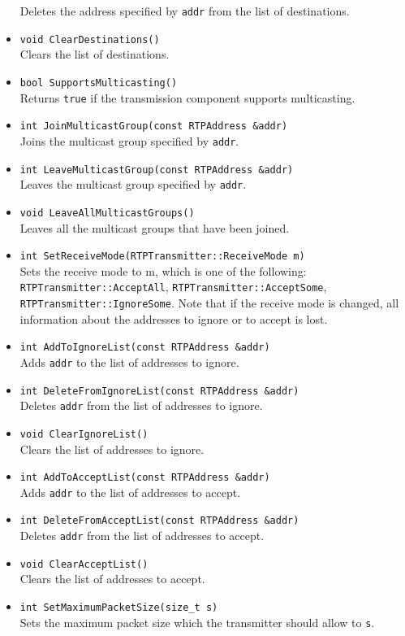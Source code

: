 \documentclass[12pt,a4paper]{article}
\begin{document}
\begin{itemize}
						Deletes the address specified by {\tt addr} from the list
						of destinations.
					\item {\tt void ClearDestinations()}\\
						Clears the list of destinations.
					\item {\tt bool SupportsMulticasting()}\\
						Returns {\tt true} if the transmission component supports
						multicasting.
					\item {\tt int JoinMulticastGroup(const RTPAddress \&addr)}\\
						Joins the multicast group specified by {\tt addr}.
					\item {\tt int LeaveMulticastGroup(const RTPAddress \&addr)}\\
						Leaves the multicast group specified by {\tt addr}.
					\item {\tt void LeaveAllMulticastGroups()}\\
						Leaves all the multicast groups that have been joined.
					\item {\tt int SetReceiveMode(RTPTransmitter::ReceiveMode m)}\\
						Sets the receive mode to m, which is one of the following:
						{\tt RTPTrans\-mitter::\-Accept\-All}, {\tt RTPTrans\-mitter::\-Accept\-Some},
						{\tt RTPTrans\-mitter::\-Ignore\-Some}. Note that if the receive
						mode is changed, all information about the addresses to ignore
						or to accept is lost.
					\item {\tt int AddToIgnoreList(const RTPAddress \&addr)}\\
						Adds {\tt addr} to the list of addresses to ignore.
					\item {\tt int DeleteFromIgnoreList(const RTPAddress \&addr)}\\
						Deletes {\tt addr} from the list of addresses to ignore.
					\item {\tt void ClearIgnoreList()}\\
						Clears the list of addresses to ignore.
					\item {\tt int AddToAcceptList(const RTPAddress \&addr)}\\
						Adds {\tt addr} to the list of addresses to accept.
					\item {\tt int DeleteFromAcceptList(const RTPAddress \&addr)}\\
						Deletes {\tt addr} from the list of addresses to accept.
					\item {\tt void ClearAcceptList()}\\
						Clears the list of addresses to accept.
					\item {\tt int SetMaximumPacketSize(size\_t s)}\\
						Sets the maximum packet size which the transmitter should
						allow to {\tt s}.
				\end{itemize}
\end{document}
